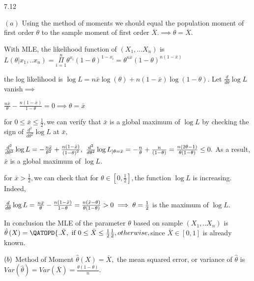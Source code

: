 \documentclass{article}
\begin{document}
7.12

$\left( a\right) $ Using the method of moments we should equal the
population moment of first order $\theta $ to the sample moment of first
order $\overline{X}.\implies \theta =\overline{X}.$

With MLE, the likelihood function of $\left( X_{1},...X_{n}\right) $ is $%
L\left( \theta |x_{1},..x_{n}\right) =\underset{i=1}{\overset{n}{\Pi }}%
\theta ^{x_{i}}\left( 1-\theta \right) ^{1-x_{i}}=\theta ^{n\bar{x}}\left(
1-\theta \right) ^{n\left( 1-\bar{x}\right) }$

the log likelihood is $\log L=n\bar{x}\log \left( \theta \right) +n\left( 1-%
\bar{x}\right) \log \left( 1-\theta \right) .$ Let $\frac{d}{d\theta }\log L$
vanish$\implies $

$\frac{n\bar{x}}{\theta }-\frac{n\left( 1-\bar{x}\right) }{1-\theta }%
=0\implies \theta =\bar{x}$

for 0$\leq \bar{x}\leq \frac{1}{2},$we can verify that $\bar{x}$ is a global
maximum of $\log L$ by checking the sign of $\frac{d^{2}}{d\theta ^{2}}\log
L $ at $\bar{x},$

$\frac{d^{2}}{d\theta ^{2}}\log L=-\frac{n\bar{x}}{\theta ^{2}}+\frac{%
n\left( 1-\bar{x}\right) }{\left( 1-\theta \right) ^{2}},$ $\frac{d^{2}}{%
d\theta ^{2}}\log L_{|\theta =\bar{x}}=-\frac{n}{\theta }+\frac{n}{\left(
1-\theta \right) }=\frac{n\left( 2\theta -1\right) }{\theta \left( 1-\theta
\right) }\leq 0.$ As a result, $\bar{x}$ is a global maximum of $\log L.$

\bigskip for $\bar{x}>\frac{1}{2},$we can check that for $\theta \in \left[
0,\frac{1}{2}\right] ,$the function $\log L$ is increasing. Indeed,

$\bigskip \frac{d}{d\theta }\log L=\frac{n\bar{x}}{\theta }-\frac{n\left( 1-%
\bar{x}\right) }{1-\theta }=\frac{n\left( \bar{x}-\theta \right) }{\theta
\left( 1-\theta \right) }>0\implies \theta =\frac{1}{2}$ is the maximum of $%
\log L.$

In conclusion the MLE of the parameter $\theta $ based on sample $\left(
X_{1},..X_{n}\right) $ is $\hat{\theta}\left( X\right) =\QATOPD\{ . {\bar{X},%
\text{ if 0}\leq \bar{X}\leq \frac{1}{2}}{\frac{1}{2},otherwise},$since $%
\bar{X}\in \left[ 0,1\right] $ is already known.

$\bigskip \left( b\right) $ Method of Moment $\hat{\theta}\left( X\right) =%
\bar{X},$ the mean squared error, or variance of $\hat{\theta}$ is $%
Var\left( \hat{\theta}\right) =Var\left( \bar{X}\right) =\frac{\theta \left(
1-\theta \right) }{n}.$
\end{document}
